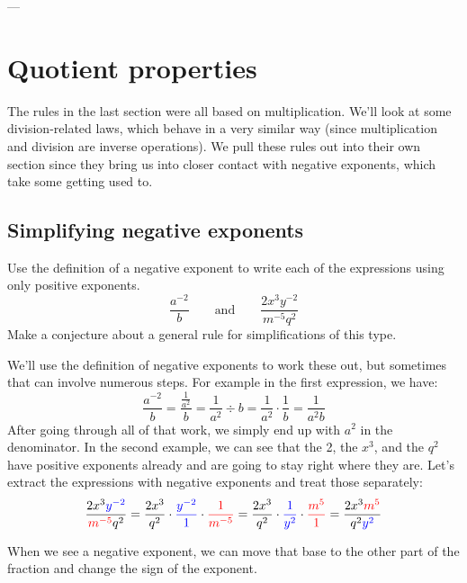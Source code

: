 \begin{boxedex}
---
\end{boxedex}


\section{Quotient properties} 
\label{sec:expoquotient}

The rules in the last section were all based on multiplication. We'll look at some division-related laws, which behave in a very similar way (since multiplication and division are inverse operations). We pull these rules out into their own section since they bring us into closer contact with negative exponents, which take some getting used to.

\subsection{Simplifying negative exponents}

\begin{boxedexplore}
Use the definition of a negative exponent to write each of the expressions using only positive exponents.
\[\frac{a^{-2}}{b} \qquad\text{and}\qquad \frac{2x^3y^{-2}}{m^{-5}q^2}\]
Make a conjecture about a general rule for simplifications of this type.
\end{boxedexplore}

We'll use the definition of negative exponents to work these out, but sometimes that can involve numerous steps. For example in the first expression, we have:
\[\frac{a^{-2}}{~b~} = \frac{\frac{1}{a^2}}{~b~} = \frac{1}{a^2}\div{b} = \frac{1}{a^2}\cdot\frac{1}{b} = \frac{1}{a^2b}\]
After going through all of that work, we simply end up with $a^2$ in the denominator. In the second example, we can see that the 2, the $x^3$, and the $q^2$ have positive exponents already and are going to stay right where they are. Let's extract the expressions with negative exponents and treat those separately:
\[\frac{2x^3{\color{blue}y^{-2}}}{{\color{red}m^{-5}}q^2}
= \frac{2x^3}{q^2}\cdot{\color{blue}\frac{y^{-2}}{1}}\cdot{\color{red}\frac{1}{m^{-5}}}
= \frac{2x^3}{q^2}\cdot{\color{blue}\frac{1}{y^2}}\cdot{\color{red}\frac{m^5}{1}}
= \frac{2x^3{\color{red}m^5}}{q^2{\color{blue}y^2}}\]

When we see a negative exponent, we can move that base to the other part of the fraction and change the sign of the exponent.

